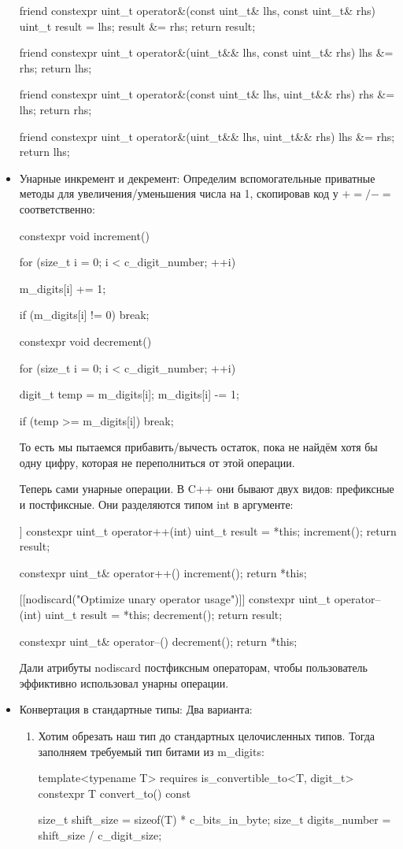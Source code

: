 \begin{itemize}
\begin{cppcode}
friend constexpr uint_t operator&(const uint_t& lhs, const uint_t& rhs) {
    uint_t result = lhs;
    result &= rhs;
    return result;
}

friend constexpr uint_t operator&(uint_t&& lhs, const uint_t& rhs) {
    lhs &= rhs;
    return lhs;
}

friend constexpr uint_t operator&(const uint_t& lhs, uint_t&& rhs) {
    rhs &= lhs;
    return rhs;
}

friend constexpr uint_t operator&(uint_t&& lhs, uint_t&& rhs) {
    lhs &= rhs;
    return lhs;
}
  \end{cppcode}
  \item Унарные инкремент и декремент:
  Определим вспомогательные приватные методы для увеличения/уменьшения числа на 1, скопировав код у $+=/-=$ соответственно:
  \begin{cppcode}
constexpr void increment() {
    for (size_t i = 0; i < c_digit_number; ++i) {
        m_digits[i] += 1;

        if (m_digits[i] != 0) {
            break;
        }
    }
}

constexpr void decrement() {
    for (size_t i = 0; i < c_digit_number; ++i) {
        digit_t temp = m_digits[i];
        m_digits[i] -= 1;

        if (temp >= m_digits[i]) {
            break;
        }
    }
}
  \end{cppcode}
  То есть мы пытаемся прибавить/вычесть остаток, пока не найдём хотя бы одну цифру, которая не переполниться от этой операции.

  Теперь сами унарные операции. В C++ они бывают двух видов: префиксные и постфиксные. Они разделяются типом int в аргументе:
  \begin{cppcode}
[[nodiscard("Optimize unary operator usage")]]
constexpr uint_t
    operator++(int) {
    uint_t result = *this;
    increment();
    return result;
}

constexpr uint_t& operator++() {
    increment();
    return *this;
}

[[nodiscard("Optimize unary operator usage")]]
constexpr uint_t
    operator--(int) {
    uint_t result = *this;
    decrement();
    return result;
}

constexpr uint_t& operator--() {
    decrement();
    return *this;
}
  \end{cppcode}
  Дали атрибуты nodiscard постфиксным операторам, чтобы пользователь эффиктивно использовал унарны операции.
  \item Конвертация в стандартные типы:
  Два варианта:
  \begin{enumerate}
    \item Хотим обрезать наш тип до стандартных целочисленных типов. Тогда заполняем требуемый тип битами из m\_digits:
    \begin{cppcode}
template<typename T>
requires is_convertible_to<T, digit_t>
constexpr T convert_to() const {
    size_t shift_size = sizeof(T) * c_bits_in_byte;
    size_t digits_number = shift_size / c_digit_size;

}
\end{cppcode}
\end{enumerate}
\end{itemize}
